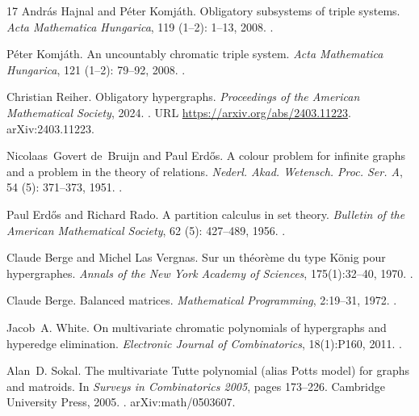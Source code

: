 \documentclass[a4paper,11pt,reqno]{amsart}
\theoremstyle{plain}
\theoremstyle{definition}
\theoremstyle{remark}
\begin{document}
\begin{thebibliography}{17}
Andr{\'a}s Hajnal and P{\'e}ter Komj{\'a}th.
\newblock Obligatory subsystems of triple systems.
\newblock \emph{Acta Mathematica Hungarica}, 119 (1--2):
  1--13, 2008.
\newblock {}.

P{\'e}ter Komj{\'a}th.
\newblock An uncountably chromatic triple system.
\newblock \emph{Acta Mathematica Hungarica}, 121 (1--2):
  79--92, 2008.
\newblock {}.

Christian Reiher.
\newblock Obligatory hypergraphs.
\newblock \emph{Proceedings of the American Mathematical Society}, 2024.
\newblock {}.
\newblock URL \url{https://arxiv.org/abs/2403.11223}.
\newblock arXiv:2403.11223.

Nicolaas~Govert de~Bruijn and Paul Erd{\H{o}}s.
\newblock A colour problem for infinite graphs and a problem in the theory of
  relations.
\newblock \emph{Nederl. Akad. Wetensch. Proc. Ser. A}, 54
  (5): 371--373, 1951.
\newblock {}.

Paul Erd{\H{o}}s and Richard Rado.
\newblock A partition calculus in set theory.
\newblock \emph{Bulletin of the American Mathematical Society}, 62
  (5): 427--489, 1956.
\newblock {}.

Claude Berge and Michel Las Vergnas.
\newblock Sur un th{\'e}or{\`e}me du type {K}{\"o}nig pour hypergraphes.
\newblock \emph{Annals of the New York Academy of Sciences}, 175(1):32--40,
  1970.
\newblock {}.

Claude Berge.
\newblock Balanced matrices.
\newblock \emph{Mathematical Programming}, 2:19--31, 1972.
\newblock {}.

Jacob~A. White.
\newblock On multivariate chromatic polynomials of hypergraphs and hyperedge
  elimination.
\newblock \emph{Electronic Journal of Combinatorics}, 18(1):P160, 2011.
\newblock {}.

Alan~D. Sokal.
\newblock The multivariate {T}utte polynomial (alias {P}otts model) for graphs
  and matroids.
\newblock In \emph{Surveys in Combinatorics 2005}, pages 173--226. Cambridge
  University Press, 2005.
\newblock {}.
\newblock arXiv:math/0503607.


\end{thebibliography}
\end{document}
